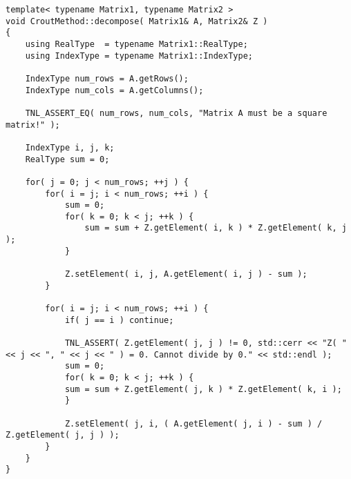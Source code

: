 \begin{lstlisting}[language={},caption={Implementation of the Crout method on the CPU using matrix $ \mathbb{Z} $. Taken from the Decomposition project repository on GitLab\protect\footref{Footnote:decomposition-project-gitlab-url}.},label={Listing:crout-method-implementation-CPU-Z}]
template< typename Matrix1, typename Matrix2 >
void CroutMethod::decompose( Matrix1& A, Matrix2& Z )
{
	using RealType  = typename Matrix1::RealType;
	using IndexType = typename Matrix1::IndexType;
	
	IndexType num_rows = A.getRows();
	IndexType num_cols = A.getColumns();
	
	TNL_ASSERT_EQ( num_rows, num_cols, "Matrix A must be a square matrix!" );
	
	IndexType i, j, k;
	RealType sum = 0;
	
	for( j = 0; j < num_rows; ++j )	{
		for( i = j; i < num_rows; ++i ) {
			sum = 0;
			for( k = 0; k < j; ++k ) {
				sum = sum + Z.getElement( i, k ) * Z.getElement( k, j );
			}
		
			Z.setElement( i, j, A.getElement( i, j ) - sum );
		}
		
		for( i = j; i < num_rows; ++i ) {
			if( j == i ) continue;
			
			TNL_ASSERT( Z.getElement( j, j ) != 0, std::cerr << "Z( " << j << ", " << j << " ) = 0. Cannot divide by 0." << std::endl );
			sum = 0;
			for( k = 0; k < j; ++k ) {
			sum = sum + Z.getElement( j, k ) * Z.getElement( k, i );
			}

			Z.setElement( j, i, ( A.getElement( j, i ) - sum ) / Z.getElement( j, j ) );
		}
	}
}
\end{lstlisting}




